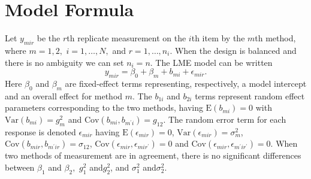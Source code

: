 \documentclass[12pt, a4paper]{report}
\theoremstyle{plain}
\theoremstyle{definition}
\theoremstyle{remark}
\begin{document}
\section{Model Formula}
Let $y_{mir} $ be the $r$th replicate measurement on the $i$th item by the $m$th method, where $m=1,2,$ $i=1,\ldots,N,$ and $r = 1,\ldots,n_i.$ When the design is balanced and there is no ambiguity we can set $n_i=n.$ The LME model can be written
\begin{equation}
y_{mir} = \beta_{0} + \beta_{m} + b_{mi} + \epsilon_{mir}.
\end{equation}
Here $\beta_0$ and $\beta_m$ are fixed-effect terms representing, respectively, a model intercept and an overall effect for method $m.$ The $b_{1i}$ and $b_{2i}$ terms represent random effect parameters corresponding to the two methods, having $\mathrm{E}(b_{mi})=0$ with $\mathrm{Var}(b_{mi})=g^2_m$ and $\mathrm{Cov}(b_{mi}, b_{m^\prime i})=g_{12}.$ The random error term for each response is denoted $\epsilon_{mir}$ having $\mathrm{E}(\epsilon_{mir})=0$, $\mathrm{Var}(\epsilon_{mir})=\sigma^2_m$, $\mathrm{Cov}(b_{mir}, b_{m^\prime ir})=\sigma_{12}$, $\mathrm{Cov}(\epsilon_{mir}, \epsilon_{mir^\prime})= 0$ and $\mathrm{Cov}(\epsilon_{mir}, \epsilon_{m^\prime ir^\prime})= 0.$
When two methods of measurement are in agreement, there is no significant differences between $\beta_1$ and $\beta_2,$ $g^2_1 $ and$ g^2_2$, and $\sigma^2_1 $ and$ \sigma^2_2$.


\newpage
\end{document}

